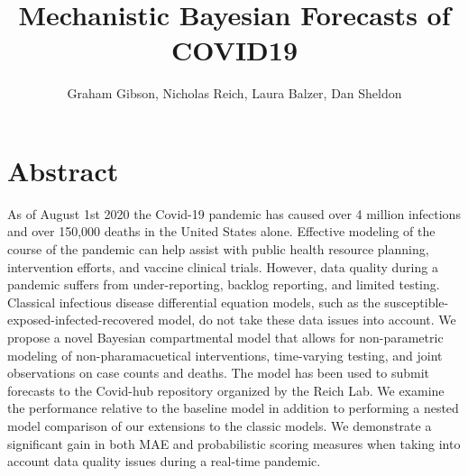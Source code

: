 \documentclass[11pt]{amsart}
\title{Mechanistic Bayesian Forecasts of COVID19}
\author{Graham Gibson, Nicholas Reich, Laura Balzer, Dan Sheldon}
\begin{document}
\maketitle

\section*{Abstract}

As of August 1st 2020 the Covid-19 pandemic has caused over 4 million infections and over 150,000 deaths in the United States alone. Effective modeling of the course of the pandemic can help assist with public health resource planning, intervention efforts, and vaccine clinical trials. However, data quality during a pandemic suffers from under-reporting, backlog reporting, and limited testing. Classical infectious disease differential equation models, such as the susceptible-exposed-infected-recovered model, do not take these data issues into account. We propose a novel Bayesian compartmental model that allows for non-parametric modeling of non-pharamacuetical interventions, time-varying testing, and joint observations on case counts and deaths. The model has been used to submit forecasts to the Covid-hub repository organized by the Reich Lab. We examine the performance relative to the baseline model in addition to performing a nested model comparison of our extensions to the classic models. We demonstrate a significant gain in both MAE and probabilistic scoring measures when taking into account data quality issues during a real-time pandemic.
\end{document}
